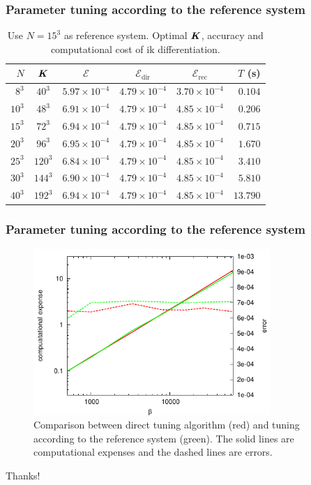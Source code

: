 \documentclass{beamer}
\renewcommand{\v}[1]{\textbf{\textit{#1}}}
\begin{document}
\begin{frame}
  \frametitle{Parameter tuning according to the reference system}
\begin{table}
  \centering
  \begin{tabular}{r|c|c|c|c|r}
    $N$    &  $\v K$ & $\mathcal E$ & $\mathcal E_{\textrm{dir}}$ & $\mathcal E_{\textrm{rec}}$ & $T$ (s) \\ \hline
$8^3$ & $40^3$ &  $5.97\times10^{-4}$ & $4.79\times10^{-4}$ & $3.70\times10^{-4}$ & $0.104$  \\
$10^3$ & $48^3$ &  $6.91\times10^{-4}$ & $4.79\times10^{-4}$ & $4.85\times10^{-4}$ & $0.206$  \\
$15^3$ & $72^3$ &  $6.94\times10^{-4}$ & $4.79\times10^{-4}$ & $4.85\times10^{-4}$ & $0.715$  \\
$20^3$ & $96^3$ &  $6.95\times10^{-4}$ & $4.79\times10^{-4}$ & $4.85\times10^{-4}$ & $1.670$  \\
$25^3$ & $120^3$ &  $6.84\times10^{-4}$ & $4.79\times10^{-4}$ & $4.85\times10^{-4}$ & $3.410$  \\
$30^3$ & $144^3$ &  $6.90\times10^{-4}$ & $4.79\times10^{-4}$ & $4.85\times10^{-4}$ & $5.810$  \\
$40^3$ & $192^3$ &  $6.94\times10^{-4}$ & $4.79\times10^{-4}$ & $4.85\times10^{-4}$ & $13.790$  
  \end{tabular}
  \caption{Use $N=15^3$ as reference system. 
    Optimal $\v K$, accuracy and computational cost of ik differentiation. 
  }
\end{table}
\end{frame}

\begin{frame}
  \frametitle{Parameter tuning according to the reference system}
\begin{figure}
  \includegraphics[width=0.8\textwidth]{figs/long-range//tune2.pdf}
  \caption{Comparison between direct tuning algorithm (red) and tuning according to the reference system (green).
  The solid lines are computational expenses and the dashed lines are errors.}
\end{figure}
\end{frame}




\begin{frame}
  \centerline{ \Huge
  Thanks! } 
\end{frame}
\end{document}
